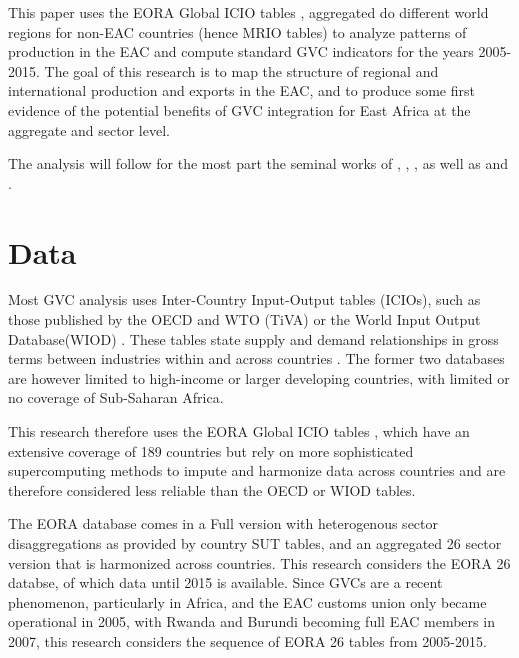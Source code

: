\documentclass[a4paper]{article}
\begin{document}
This paper uses the EORA Global ICIO tables \citet{lenzen2012mapping, lenzen2013building}, aggregated do different world regions for non-EAC countries (hence MRIO tables) to analyze patterns of production in the EAC and compute standard GVC indicators for the years 2005-2015. The goal of this research is to map the structure of regional and international production and exports in the EAC, and to produce some first evidence of the potential benefits of GVC integration for East Africa at the aggregate and sector level. \newline

The analysis will follow for the most part the seminal works of \citet{hummels2001nature}, \citet{koopman2014tracing}, \citet{wang2013quantifying}, as well as \citet{Kummritz20161} and \citet{Kummritz20162}. 

\section{Data}
Most GVC analysis uses Inter-Country Input-Output tables (ICIOs), such as those
published by the OECD and WTO (TiVA) or the World Input Output Database(WIOD)  \citep{timmer2012world}. These tables state supply and demand relationships in gross terms between industries within and across countries \citep{Kummritz2014}. The former two databases are however limited to high-income or larger developing countries, with limited or no coverage of Sub-Saharan Africa. \newline

This research therefore uses the EORA Global ICIO tables \citep{lenzen2012mapping, lenzen2013building}, which have an extensive coverage of 189 countries but rely on more sophisticated supercomputing methods to impute and harmonize data across countries and are therefore considered less reliable than the OECD or WIOD tables. \newline

The EORA database comes in a Full version with heterogenous sector disaggregations as provided by country SUT tables, and an aggregated 26 sector version that is harmonized across countries. This research considers the EORA 26 databse, of which data until 2015 is available. Since GVCs are a recent phenomenon, particularly in Africa, and the EAC customs union only became operational in 2005, with Rwanda and Burundi becoming full EAC members in 2007, this research considers the sequence of EORA 26 tables from 2005-2015. \newline
\end{document}
